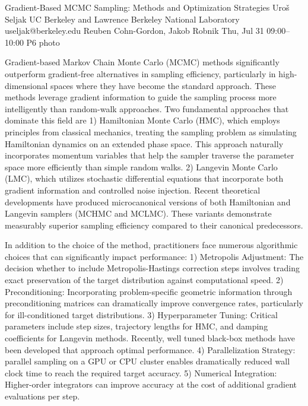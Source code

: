 \clearpage
\begin{talk}
  {Gradient-Based MCMC Sampling: Methods and Optimization Strategies}%
  {Uro\v s Seljak}%
  {UC Berkeley and Lawrence Berkeley National Laboratory}%
  {useljak@berkeley.edu}%
  {Reuben Cohn-Gordon, Jakob Robnik}%
  {}%
  {Thu, Jul 31 09:00--10:00}%
  {P6}%
  {photo}%
  
    
   
\vspace{-5ex}Gradient-based Markov Chain Monte Carlo (MCMC) methods significantly outperform gradient-free alternatives in sampling efficiency, particularly in high-dimensional spaces where they have become the standard approach. These methods leverage gradient information to guide the sampling process more intelligently than random-walk approaches.
Two fundamental approaches that dominate this field are 1)
Hamiltonian Monte Carlo (HMC), which  employs principles from classical mechanics, treating the sampling problem as simulating Hamiltonian dynamics on an extended phase space. This approach naturally incorporates momentum variables that help the sampler traverse the parameter space more efficiently than simple random walks. 2)
Langevin Monte Carlo (LMC), which utilizes stochastic differential equations that incorporate both gradient information and controlled noise injection. 
Recent theoretical developments have produced microcanonical versions of both Hamiltonian and Langevin samplers (MCHMC and MCLMC). These variants demonstrate measurably superior sampling efficiency compared to their canonical predecessors.

In addition to the choice of 
the method, 
practitioners face numerous algorithmic choices that can significantly impact performance:
1) Metropolis Adjustment: The decision whether to include Metropolis-Hastings correction steps involves trading exact preservation of the target distribution against computational speed.
2) Preconditioning: Incorporating problem-specific geometric information through preconditioning matrices can dramatically improve convergence rates, particularly for ill-conditioned target distributions.
3) Hyperparameter Tuning: Critical parameters include step sizes, trajectory lengths for HMC, and damping coefficients for Langevin methods. Recently, well tuned black-box methods have been developed that approach optimal performance. 
4) Parallelization Strategy: parallel sampling on a GPU or CPU cluster enables dramatically reduced wall clock time to reach the required target accuracy. 
5) Numerical Integration: Higher-order integrators can improve accuracy at the cost of additional gradient evaluations per step.


\end{talk}
